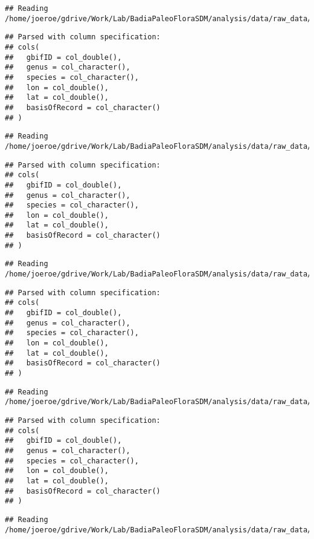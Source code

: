 \documentclass[]{article}
\begin{document}
\begin{verbatim}
## Reading /home/joeroe/gdrive/Work/Lab/BadiaPaleoFloraSDM/analysis/data/raw_data/gbif/gbif_triticum_urartu.csv
\end{verbatim}

\begin{verbatim}
## Parsed with column specification:
## cols(
##   gbifID = col_double(),
##   genus = col_character(),
##   species = col_character(),
##   lon = col_double(),
##   lat = col_double(),
##   basisOfRecord = col_character()
## )
\end{verbatim}

\begin{verbatim}
## Reading /home/joeroe/gdrive/Work/Lab/BadiaPaleoFloraSDM/analysis/data/raw_data/gbif/gbif_triticum_dicoccoides.csv
\end{verbatim}

\begin{verbatim}
## Parsed with column specification:
## cols(
##   gbifID = col_double(),
##   genus = col_character(),
##   species = col_character(),
##   lon = col_double(),
##   lat = col_double(),
##   basisOfRecord = col_character()
## )
\end{verbatim}

\begin{verbatim}
## Reading /home/joeroe/gdrive/Work/Lab/BadiaPaleoFloraSDM/analysis/data/raw_data/gbif/gbif_stipa.csv
\end{verbatim}

\begin{verbatim}
## Parsed with column specification:
## cols(
##   gbifID = col_double(),
##   genus = col_character(),
##   species = col_character(),
##   lon = col_double(),
##   lat = col_double(),
##   basisOfRecord = col_character()
## )
\end{verbatim}

\begin{verbatim}
## Reading /home/joeroe/gdrive/Work/Lab/BadiaPaleoFloraSDM/analysis/data/raw_data/gbif/gbif_zilla_spinosa.csv
\end{verbatim}

\begin{verbatim}
## Parsed with column specification:
## cols(
##   gbifID = col_double(),
##   genus = col_character(),
##   species = col_character(),
##   lon = col_double(),
##   lat = col_double(),
##   basisOfRecord = col_character()
## )
\end{verbatim}

\begin{verbatim}
## Reading /home/joeroe/gdrive/Work/Lab/BadiaPaleoFloraSDM/analysis/data/raw_data/gbif/gbif_vitex.csv
\end{verbatim}
\end{document}
